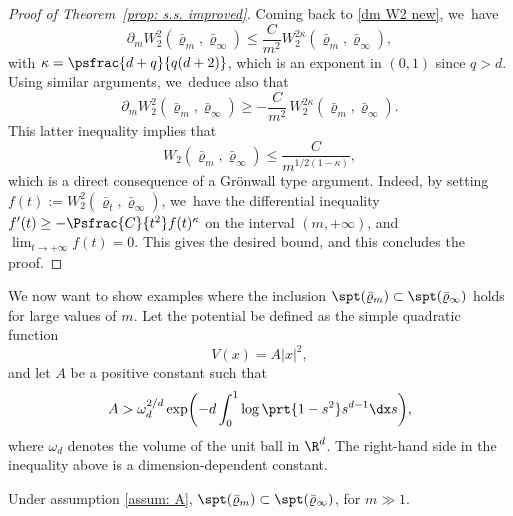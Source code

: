 \begin{proof}[Proof of Theorem~\ref{prop: s.s. improved}]
Coming back to \eqref{dm W2 new}, we~have
\begin{equation*}
\partial_m W_2^2(\bar\varrho_m, \bar\varrho_\infty)\leq \frac{C}{m^2} W_2^{2\kappa}{ (\bar\varrho_m, \bar\varrho_\infty)},
\end{equation*}
with $\kappa = \psfrac{d+{ q}}{{ q}(d+2)}$, which is an exponent in $(0,1)$ since $q>d$. Using similar arguments, we~deduce also that
\begin{equation*}
\partial_m W_2^2(\bar\varrho_m, \bar\varrho_\infty)\ge - \frac{C}{m^2}\, W_2^{2\kappa}{ (\bar\varrho_m, \bar\varrho_\infty)}.
\end{equation*}
This latter inequality implies that
\begin{equation*}
W_2(\bar\varrho_m,\bar\varrho_\infty) \leq \frac{C}{m^{1/2(1-\kappa)}},
\end{equation*}
which is a direct consequence of a Grönwall type argument. Indeed, by setting $f(t):=W_2^2(\bar\varrho_t, \bar\varrho_\infty)$, we~have the differential inequality $f'(t) \ge -\Psfrac{C}{t^{2}}f(t)^{\kappa}$ on the interval $(m,+\infty)$, and $\lim_{t\to+\infty}f(t) = 0$. This gives the desired bound, and this concludes the proof.
\end{proof}

We now want to show examples where the inclusion $\spt(\bar \varrho_m)\subset\spt (\bar \varrho_\infty)$ holds for large values of $m$.
Let the potential be defined as the simple quadratic function
\begin{equation*}
V(x)= A|x|^2,
\end{equation*}
and let $A$ be a positive constant such that
\begin{equation}\label{assum: A}
A> \omega_d^{2/d}\exp\biggl(- { d}\int_0^1 \log\prt{1- s^2} s^{d-1}\dx s\biggr),
\end{equation}
where $\omega_d$ denotes the volume of the unit ball in $\R^d$. The right-hand side in the inequality above is a dimension-dependent constant.

\begin{claim}
Under assumption \eqref{assum: A}, $\spt(\bar \varrho_m)\subset\spt (\bar \varrho_\infty)$, for $m\gg 1.$
\end{claim}

